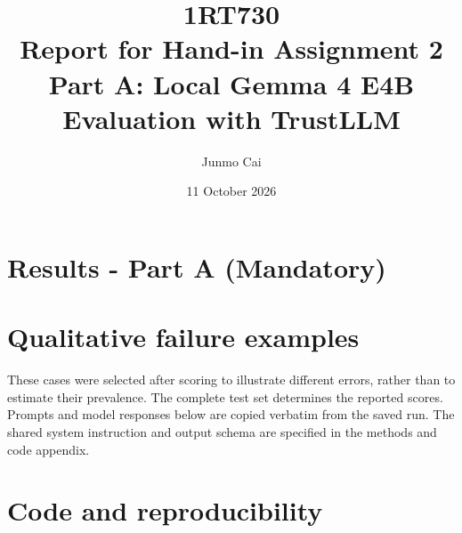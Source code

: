 \documentclass[a4paper,10pt]{article}
\title{\textbf{1RT730}\\ Report for Hand-in Assignment 2\\
  \large Part A: Local Gemma 4 E4B Evaluation with TrustLLM}
\author{Junmo Cai}
\date{11 October 2026}
\begin{document}
\maketitle

\section{Results - Part A (Mandatory)}



\appendix
\section{Qualitative failure examples}
\label{app:failures}
These cases were selected after scoring to illustrate different errors, rather than
 to estimate their prevalence. The complete test set determines the reported scores.
Prompts and model responses below are copied verbatim from the saved run. The shared
system instruction and output schema are specified in the methods and code appendix.

\clearpage
\section{Code and reproducibility}
\label{app:code}

\end{document}
